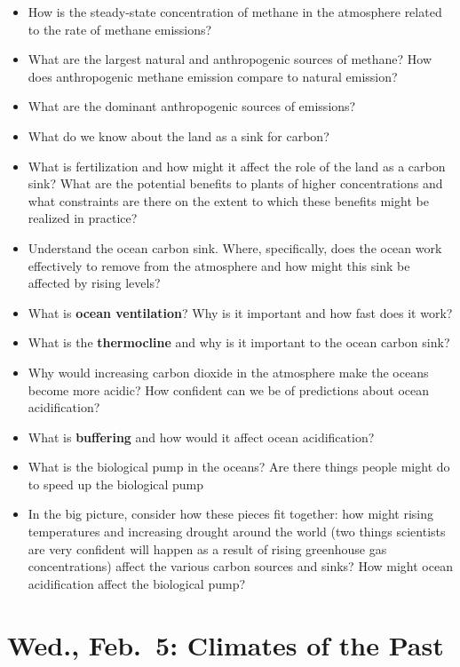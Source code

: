 \documentclass[
]{article}
\providecommand{\tightlist}{%
  \setlength{\itemsep}{0pt}\setlength{\parskip}{0pt}}
\newcommand{\COO}{\ce{CO2}}
\begin{document}
\begin{itemize}
\tightlist
\item
  How is the steady-state concentration of methane in the atmosphere
  related to the rate of methane emissions?
\item
  What are the largest natural and anthropogenic sources of methane? How
  does anthropogenic methane emission compare to natural emission?
\item
  What are the dominant anthropogenic sources of \COO emissions?
\item
  What do we know about the land as a sink for carbon?
\item
  What is \COO fertilization and how might it affect the role of the
  land as a carbon sink? What are the potential benefits to plants of
  higher \COO concentrations and what constraints are there on the
  extent to which these benefits might be realized in practice?
\item
  Understand the ocean carbon sink. Where, specifically, does the ocean
  work effectively to remove \COO from the atmosphere and how might this
  sink be affected by rising \COO levels?
\item
  What is \textbf{ocean ventilation}? Why is it important and how fast
  does it work?
\item
  What is the \textbf{thermocline} and why is it important to the ocean
  carbon sink?
\item
  Why would increasing carbon dioxide in the atmosphere make the oceans
  become more acidic? How confident can we be of predictions about ocean
  acidification?
\item
  What is \textbf{buffering} and how would it affect ocean
  acidification?
\item
  What is the biological pump in the oceans? Are there things people
  might do to speed up the biological pump
\item
  In the big picture, consider how these pieces fit together: how might
  rising temperatures and increasing drought around the world (two
  things scientists are very confident will happen as a result of rising
  greenhouse gas concentrations) affect the various carbon sources and
  sinks? How might ocean acidification affect the biological pump?
\end{itemize}

\hypertarget{wed.-feb.-5-climates-of-the-past}{%
\section{Wed., Feb.~5: Climates of the
Past}\label{wed.-feb.-5-climates-of-the-past}}
\end{document}
